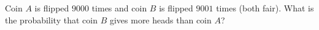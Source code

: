 Coin $A$ is flipped $9000$ times and coin $B$ is flipped $9001$ times (both fair). What is the probability that coin $B$ gives more heads than coin $A$?
